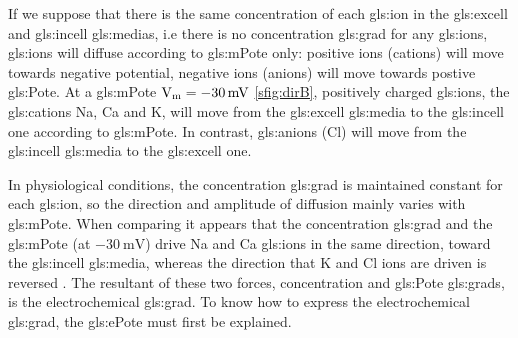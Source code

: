 \documentclass[class={myRUCProject}, crop=false]{standalone}
\begin{document}
If we suppose that there is the same concentration of each \gls{gls:ion} in the \gls{gls:excell} and \gls{gls:incell} \glspl{gls:media}, i.e there is no concentration \gls{gls:grad} for any \glspl{gls:ion}, \glspl{gls:ion} will diffuse according to \gls{gls:mPote} only: positive ions (cations) will move towards negative potential, negative ions (anions) will move towards postive \gls{gls:Pote}. At a \gls{gls:mPote} \(\unit{\V\membrane}=\qty{-30}{\mV}\) \cref{sfig:dirB}, positively charged \glspl{gls:ion}, the \glspl{gls:cation} \gls{Na}, \gls{Ca} and \gls{K}, will move from the \gls{gls:excell} \gls{gls:media} to the \gls{gls:incell} one according to \gls{gls:mPote}. In contrast, \glspl{gls:anion} (\gls{Cl}) will move from the \gls{gls:incell} \gls{gls:media} to the \gls{gls:excell} one. 

In physiological conditions, the concentration \gls{gls:grad} is maintained constant for each \gls{gls:ion}, so the direction and amplitude of diffusion mainly varies with \gls{gls:mPote}. When comparing  it appears that the concentration \gls{gls:grad} and the \gls{gls:mPote} (at \(\qty{-30}{\mV}\)) drive \gls{Na} and \gls{Ca} \glspl{gls:ion} in the same direction, toward the \gls{gls:incell} \gls{gls:media}, whereas the direction that \gls{K} and \gls{Cl} ions are driven is reversed . The resultant of these two forces, concentration and \gls{gls:Pote} \glspl{gls:grad}, is the electrochemical \gls{gls:grad}. To know how to express the electrochemical \gls{gls:grad}, the \gls{gls:ePote} must first be explained.
 
\end{document}
